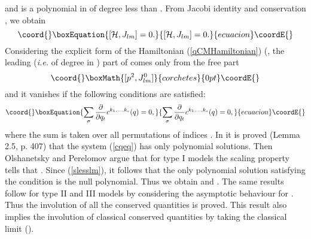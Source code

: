 \documentclass[a4paper,12pt]{article}
\begin{document}
and \coordHE{} is a polynomial in \coordHE{}
of degree less than \coordHE{}.
\noindent From Jacobi identity and conservation \coordHE{},
we obtain
\begin{equation}\coord{}\boxEquation{
   [{\cal H},J_{lm}]=0.
}{
   [{\cal H},J_{lm}]=0.
}{ecuacion}\coordE{}\end{equation}
Considering the explicit form of the Hamiltonian (\ref{qCMHamiltonian})
(\coordHE{}, the leading ({\em i.e.\/} of degree \coordHE{} in \coordHE{})
part
of \myHighlight{\([{\cal H},J_{lm}]\)}\coordHE{} comes only from the free part
\[\coord{}\boxMath{
   [p^2,J_{lm}^0]
}{corchetes}{0pt}\coordE{}\]
and it vanishes if the following conditions are satisfied:
\begin{equation}\coord{}\boxEquation{
   \sum_{\sigma}{\partial\over{\partial q_t}}c^{k_1,\ldots,k_s}(q)
   =0,
\label{cqeq}
}{
   \sum_{\sigma}{\partial\over{\partial q_t}}c^{k_1,\ldots,k_s}(q)
   =0,
}{ecuacion}\coordE{}\end{equation}
where the sum is taken over all permutations of indices
\coordHE{}.
In \cite{Bere} it is proved (Lemma 2.5, p. 407) that the system
(\ref{cqeq}) has
only polynomial solutions.
Then Olshanetsky and Perelomov argue that for type I models the scaling
property tells that \coordHE{}. Since \coordHE{}
(\ref{slesslm}), it follows that the only polynomial solution  satisfying
the condition is the null polynomial. Thus we obtain
\coordHE{} \coordHE{} and \coordHE{}.
The same results follow for type II and III models by considering the
asymptotic behaviour for \coordHE{}. Thus the involution of all the
conserved quantities \coordHE{} is proved. This result also implies the
involution of classical conserved quantities by taking the classical
limit (\coordHE{}).
\end{document}
